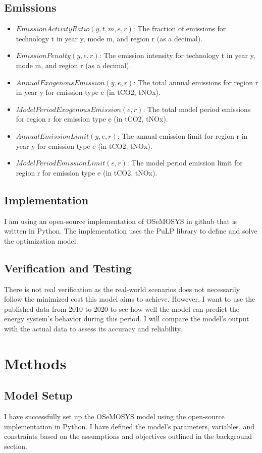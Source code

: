 \documentclass[11pt]{article}
\begin{document}
\subsection{Emissions}
\begin{itemize}
    \item $EmissionActivityRatio(y,t,m,e,r)$: The fraction of emissions for technology t in year y, mode m, and region r (as a decimal).
    \item $EmissionPenalty(y,e,r)$: The emission intensity for technology t in year y, mode m, and region r (as a decimal).
    \item $AnnualExogenousEmission(y,e,r)$: The total annual emissions for region r in year y for emission type e (in tCO2, tNOx).
    \item $ModelPeriodExogenousEmission(e,r)$: The total model period emissions for region r for emission type e (in tCO2, tNOx).
    \item $AnnualEmissionLimit(y,e,r)$: The annual emission limit for region r in year y for emission type e (in tCO2, tNOx).
    \item $ModelPeriodEmissionLimit(e,r)$: The model period emission limit for region r for emission type e (in tCO2, tNOx).
\end{itemize}

\subsection{Implementation}
I am using an open-source implementation of OSeMOSYS in github \cite{githubrepo} that is written in Python. The implementation \cite{Dreier2019} uses the PuLP library to define and solve the optimization model.

\subsection{Verification and Testing}
There is not real verification as the real-world scenarios does not necessarily follow the minimized cost this model aims to achieve. However, I want to use the published data from 2010 to 2020 to see how well the model can predict the energy system's behavior during this period. I will compare the model's output with the actual data to assess its accuracy and reliability.


\section{Methods}
\subsection{Model Setup}
I have successfully set up the OSeMOSYS model using the open-source implementation in Python. I have defined the model's parameters, variables, and constraints based on the assumptions and objectives outlined in the background section.
\end{document}
